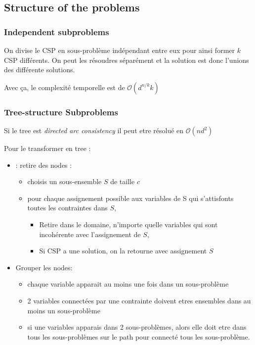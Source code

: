 	\subsection{Structure of the problems}
		\subsubsection{Independent subproblems}
			On divise le CSP en sous-problème indépendant entre eux pour ainsi former $k$ CSP différents. On peut les résoudres séparément et la solution est donc l'unions des différente solutions. 
		
		Avec ça, le complexité temporelle est de $\mathcal{O}(d^{n/k}k)$
			
		\subsubsection{Tree-structure Subproblems}
		
			Si le tree est \textit{directed arc consistency} il peut etre résolué en $\mathcal{O}(nd^2)$
			
			Pour le transformer en tree :
			\begin{itemize}
				\item : retire des nodes :
				\begin{itemize}
					\item choisis un sous-ensemble $S$ de taille $c$
					\item pour chaque assignement possible aux variables de S qui s'attisfonts toutes les contraintes dans $S$,
					\begin{itemize}
						\item Retire dans le domaine, n'importe quelle variables qui sont incohérente avec l'assignement de $S$,
						\item Si CSP a une solution, on la retourne avec assignement $S$
					\end{itemize}
				\end{itemize}
				\item Grouper les nodes:
				\begin{itemize}
					\item chaque variable apparait au moins une fois dans un sous-problème
					\item 2 variables connectées par une contrainte doivent etres ensembles dans au moins un sous-problème
					\item si une variables apparais dans 2 sous-problèmes, alors elle doit etre dans tous les sous-problèmes sur le path pour connecté tous les sous-problème.
				\end{itemize}
			\end{itemize}